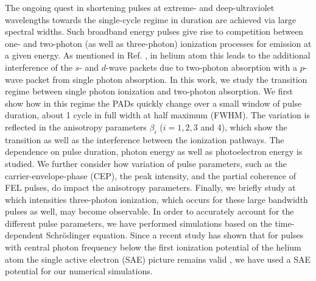 The ongoing quest in shortening pulses at extreme- and deep-ultraviolet wavelengths towards the single-cycle regime in duration are achieved via large spectral widths. Such broadband energy pulses give rise to competition between one- and two-photon (as well as three-photon) ionization processes for emission at a given energy. As mentioned in Ref. \cite{boll2019}, in helium atom this leads to the additional interference of the $s$- and $d$-wave packets due to two-photon absorption with a $p$-wave packet from single photon absorption. In this work, we study the transition regime between single photon ionization and two-photon absorption. We first show how in this regime the PADs quickly change over a small window of pulse duration, about 1 cycle in full width at half maximum (FWHM). The variation is reflected in the anisotropy parameters $\beta_i$ ($i = 1, 2, 3$ and $4$), which show the transition as well as the interference between the ionization pathways. The dependence on pulse duration, photon energy as well as photoelectron energy is studied. We further consider how variation of pulse parameters, such as the carrier-envelope-phase (CEP), the peak intensity, and the partial coherence of FEL pulses, do impact the anisotropy parameters. Finally, we briefly study at which intensities three-photon ionization, which occurs for these large bandwidth pulses as well, may become observable. In order to accurately account for the different pulse parameters, we have performed simulations based on the time-dependent Schr\"odinger equation. 
Since a recent study has shown that for pulses with central photon frequency below the first ionization potential of the helium atom the single active electron (SAE) picture remains valid \cite{boll2019}, we have used a SAE potential for our numerical simulations. 

